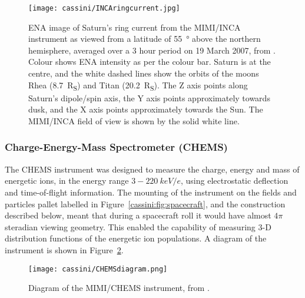 \begin{figure}
\centering
\noindent\texttt{[image: cassini/INCAringcurrent.jpg]}
\caption[ENA image of Saturn's ring current from MIMI/INCA.]{ENA image of Saturn's ring current from the MIMI/INCA instrument as viewed from a latitude of \SI{55}{\degree} above the northern hemisphere, averaged over a 3 hour period on 19 March 2007, from \citet{nasa2007}. Colour shows ENA intensity as per the colour bar. Saturn is at the  centre, and the white dashed lines show the orbits of the moons Rhea (\SI{8.7}{R_S}) and Titan (\SI{20.2}{R_S}). The Z axis points along Saturn's dipole/spin axis, the Y axis points approximately towards dusk, and the X axis points approximately  towards the Sun. The MIMI/INCA field of view is shown by the solid white line.}
\label{cassini:fig:INCAringcurrent}
\end{figure}

\subsubsection{Charge-Energy-Mass Spectrometer (CHEMS)}
The CHEMS instrument was designed to measure the charge, energy and mass of energetic ions, in the energy range $3-\SI{220}{keV/e}$, using electrostatic deflection and time-of-flight information. The mounting of the instrument on the fields and particles pallet labelled in Figure~\ref{cassini:fig:spacecraft}, and the construction described below, meant that during a spacecraft roll it would have almost $4\pi$ steradian viewing geometry. This enabled the capability of measuring 3-D distribution functions of the energetic ion populations. A diagram of the instrument is shown in Figure~\ref{cassini:fig:CHEMSdiagram}.

\begin{figure}
\centering
\noindent\texttt{[image: cassini/CHEMSdiagram.png]}
\caption[Diagram of the MIMI/CHEMS instrument.]{Diagram of the MIMI/CHEMS instrument, from \citet{krimigis2004}.}
\label{cassini:fig:CHEMSdiagram}
\end{figure}

